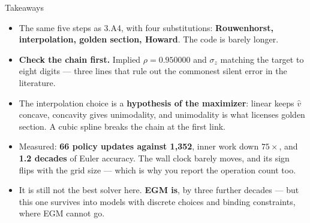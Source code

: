 \begin{frame}{Takeaways}
\begin{takeawaybox}
\begin{itemize}\small
  \item The same five steps as 3.A4, with four substitutions: \textbf{Rouwenhorst, interpolation, golden section, Howard}. The code is barely longer.
  \item \textbf{Check the chain first.} Implied $\rho=0.950000$ and $\sigma_z$ matching the target to eight digits --- three lines that rule out the commonest silent error in the literature.
  \item The interpolation choice is a \textbf{hypothesis of the maximizer}: linear keeps $\hat v$ concave, concavity gives unimodality, and unimodality is what licenses golden section. A cubic spline breaks the chain at the first link.
  \item Measured: \textbf{66 policy updates against 1,352}, inner work down $75\times$, and \textbf{1.2 decades} of Euler accuracy. The wall clock barely moves, and its sign flips with the grid size --- which is why you report the operation count too.
  \item It is still not the best solver here. \textbf{EGM is}, by three further decades --- but this one survives into models with discrete choices and binding constraints, where EGM cannot go.
\end{itemize}
\end{takeawaybox}
\end{frame}

